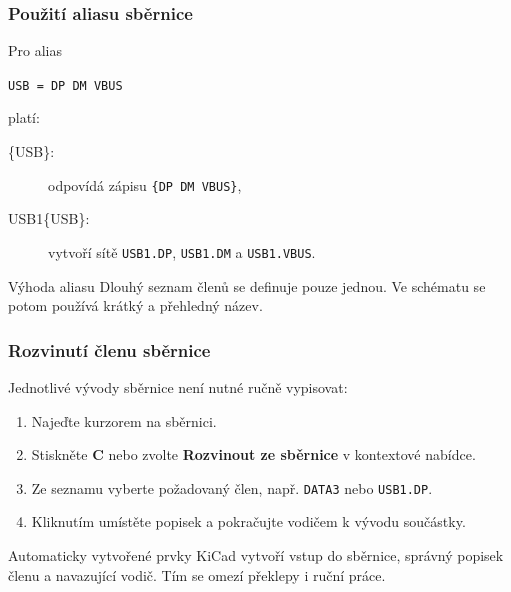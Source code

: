\documentclass{beamer}
\begin{document}
\begin{frame}
	\frametitle{Použití aliasu sběrnice}
	Pro alias
	\begin{center}
		\texttt{USB = DP DM VBUS}
	\end{center}
	platí:
	\begin{description}
		\item[\{USB\}:] odpovídá zápisu \texttt{\{DP DM VBUS\}},
		\item[USB1\{USB\}:] vytvoří sítě \texttt{USB1.DP}, \texttt{USB1.DM} a \texttt{USB1.VBUS}.
	\end{description}

	\vfill
	\begin{block}{Výhoda aliasu}
		Dlouhý seznam členů se definuje pouze jednou. Ve schématu se potom používá krátký a přehledný název.
	\end{block}
\end{frame}

\begin{frame}
	\frametitle{Rozvinutí členu sběrnice}
	Jednotlivé vývody sběrnice není nutné ručně vypisovat:
	\begin{enumerate}
		\item Najeďte kurzorem na sběrnici.
		\item Stiskněte \textbf{C} nebo zvolte \textbf{Rozvinout ze sběrnice} v kontextové nabídce.
		\item Ze seznamu vyberte požadovaný člen, např. \texttt{DATA3} nebo \texttt{USB1.DP}.
		\item Kliknutím umístěte popisek a pokračujte vodičem k vývodu součástky.
	\end{enumerate}

	\vfill
	\begin{block}{Automaticky vytvořené prvky}
		KiCad vytvoří vstup do sběrnice, správný popisek členu a navazující vodič. Tím se omezí překlepy i ruční práce.
	\end{block}
\end{frame}
\end{document}
